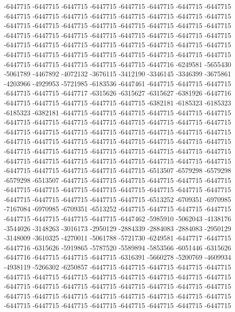 -6447715 -6447715 -6447715 -6447715 -6447715 -6447715 -6447715 -6447715 -6447715 -6447715 -6447715 -6447715 -6447715 -6447715 -6447715 -6447715 -6447715 -6447715 -6447715 -6447715 -6447715 -6447715 -6447715 -6447715 -6447715 -6447715 -6447715 -6447715 -6447715 -6447715 -6447715 -6447715 -6447715 -6447715 -6447715 -6447715 -6447715 -6447715 -6447715 -6447715 -6447715 -6447715 -6447715 -6447715 -6447715 -6447715 -6447715 -6447715 -6447715 -6447715 -6447715 -6447715 -6447715 -6447716 -6249581 -5655430 -5061789 -4467892 -4072132 -3676115 -3412190 -3346145 -3346399 -3675861 -4203966 -4929953 -5721985 -6183536 -6447461 -6447715 -6447715 -6447715 -6447715 -6447715 -6447717 -6315626 -6315627 -6315627 -6381926 -6447716 -6447715 -6447715 -6447715 -6447715 -6447715 -6382181 -6185323 -6185323 -6185323 -6382181 -6447715 -6447715 -6447715 -6447715 -6447715 -6447715 -6447715 -6447715 -6447715 -6447715 -6447715 -6447715 -6447715 -6447715 -6447715 -6447715 -6447715 -6447715 -6447715 -6447715 -6447715 -6447715 -6447715 -6447715 -6447715 -6447715 -6447715 -6447715 -6447715 -6447715 -6447715 -6447715 -6447715 -6447715 -6447715 -6447715 -6447715 -6447715
-6447715 -6447715 -6447715 -6447715 -6447715 -6447715 -6447715 -6447715 -6447715 -6447715 -6447715 -6447715 -6447715 -6513507 -6579298 -6579298 -6579298 -6513507 -6447715 -6447715 -6447715 -6447715 -6447715 -6447715 -6447715 -6447715 -6447715 -6447715 -6447715 -6447715 -6447715 -6447715 -6447715 -6447715 -6447715 -6447715 -6447715 -6513252 -6709351 -6970985 -7167084 -6970985 -6709351 -6513252 -6447715 -6447715 -6447715 -6447715 -6447715 -6447715 -6447715 -6447715 -6447462 -5985910 -5062043 -4138176 -3544026 -3148263 -3016173 -2950129 -2884339 -2884083 -2884083 -2950129 -3148009 -3610325 -4270011 -5061788 -5721730 -6249581 -6447717 -6447715 -6447716 -6315626 -5919865 -5787520 -5589894 -5853566 -6051446 -6315626 -6447716 -6447715 -6447715 -6447715 -6316391 -5660278 -5200769 -4609934 -4938119 -5266302 -6250857 -6447715 -6447715 -6447715 -6447715 -6447715 -6447715 -6447715 -6447715 -6447715 -6447715 -6447715 -6447715 -6447715 -6447715 -6447715 -6447715 -6447715 -6447715 -6447715 -6447715 -6447715 -6447715 -6447715 -6447715 -6447715 -6447715 -6447715 -6447715 -6447715 -6447715 -6447715 -6447715 -6447715 -6447715 -6447715 -6447715 -6447715

